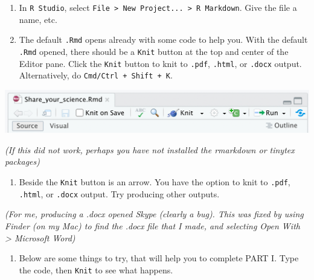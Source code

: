 \documentclass[
]{book}
\providecommand{\tightlist}{%
  \setlength{\itemsep}{0pt}\setlength{\parskip}{0pt}}
\begin{document}
\begin{enumerate}
\def\labelenumi{\arabic{enumi}.}
\item
  In \texttt{R\ Studio}, select \texttt{File\ \textgreater{}\ New\ Project...\ \textgreater{}\ R\ Markdown}. Give the file a name, etc.
\item
  The default \texttt{.Rmd} opens already with some code to help you. With the default \texttt{.Rmd} opened, there should be a \texttt{Knit} button at the top and center of the Editor pane. Click the \texttt{Knit} button to knit to \texttt{.pdf}, \texttt{.html}, or \texttt{.docx} output. Alternatively, do \texttt{Cmd/Ctrl\ +\ Shift\ +\ K}.
\end{enumerate}

\begin{center}\includegraphics[width=0.5\linewidth]{figures/Knit} \end{center}

\emph{(If this did not work, perhaps you have not installed the rmarkdown or tinytex packages)}

\begin{enumerate}
\def\labelenumi{\arabic{enumi}.}
\setcounter{enumi}{2}
\tightlist
\item
  Beside the \texttt{Knit} button is an arrow. You have the option to knit to \texttt{.pdf}, \texttt{.html}, or \texttt{.docx} output. Try producing other outputs.
\end{enumerate}

\emph{(For me, producing a .docx opened Skype (clearly a bug). This was fixed by using Finder (on my Mac) to find the .docx file that I made, and selecting Open With \textgreater{} Microsoft Word)}

\begin{enumerate}
\def\labelenumi{\arabic{enumi}.}
\setcounter{enumi}{3}
\tightlist
\item
  Below are some things to try, that will help you to complete PART I. Type the code, then \texttt{Knit} to see what happens.
\end{enumerate}
\end{document}
